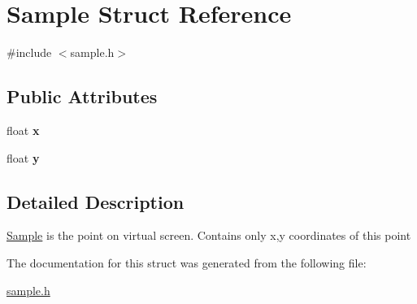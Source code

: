 \hypertarget{struct_sample}{}\section{Sample Struct Reference}
\label{struct_sample}


{\ttfamily \#include $<$sample.\+h$>$}

\subsection*{Public Attributes}
\begin{DoxyCompactItemize}
\item 
\mbox{\label{struct_sample_ab1a2036e1dfe0e5e72b50d57e0c0881a}} 
float {\bfseries x}
\item 
\mbox{\label{struct_sample_aa187ba2938ab0105050bc859dcc03a1f}} 
float {\bfseries y}
\end{DoxyCompactItemize}


\subsection{Detailed Description}
\mbox{\hyperlink{struct_sample}{Sample}} is the point on virtual screen. Contains only x,y coordinates of this point 

The documentation for this struct was generated from the following file\+:\begin{DoxyCompactItemize}
\item 
\mbox{\hyperlink{sample_8h}{sample.\+h}}\end{DoxyCompactItemize}
